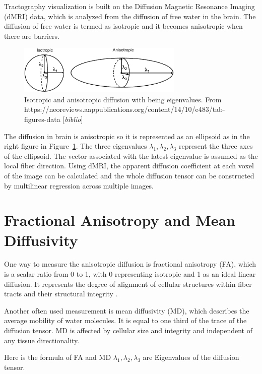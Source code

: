 \documentclass[a4paper, 12pt]{report}
\newcommand{\comment}[1]{{\color{red}[\textit{#1}]}}
\begin{document}
Tractography visualization is built on the Diffusion Magnetic Resonance Imaging (dMRI) data, which is analyzed from the diffusion of free water in the brain. The diffusion of free water is termed as isotropic and it becomes anisotropic when there are barriers. 

\begin{figure}[h]
	\centering
	\includegraphics[width=0.7\textwidth]{iso_ani_diff}
	\caption{Isotropic and anisotropic diffusion with  being eigenvalues. From
https://neoreviews.aappublications.org/content/14/10/e483/tab-figures-data \comment{biblio}}
	\label{fig:iso_ani_diff}
\end{figure}

The diffusion in brain is anisotropic so it is represented as an ellipsoid as in the right figure in Figure~\ref{fig:iso_ani_diff}. The three eigenvalues  $\lambda_1, \lambda_2, \lambda_3$ represent the three axes of the ellipsoid. The vector associated with the latest eigenvalue is assumed as the local fiber direction.\cite{tak}
Using dMRI, the apparent diffusion coefficient at each voxel of the image can be calculated and the whole diffusion tensor can be constructed by multilinear regression across multiple images.

\section{Fractional Anisotropy and Mean Diffusivity }
One way to measure the anisotropic diffusion is fractional anisotropy (FA), which is a scalar ratio from 0 to 1, with 0 representing isotropic and 1 as an ideal linear diffusion. It represents the degree of alignment of cellular structures within fiber tracts and their structural integrity \cite{cer}.

Another often used measurement is mean diffusivity (MD), which describes the average mobility of water molecules. It is equal to one third of the trace of the diffusion tensor. MD is affected by cellular size and integrity and independent of any tissue directionality. \cite{cer}

Here is the formula of FA and MD $\lambda_1, \lambda_2, \lambda_3$  are Eigenvalues of the diffusion tensor.
\end{document}
